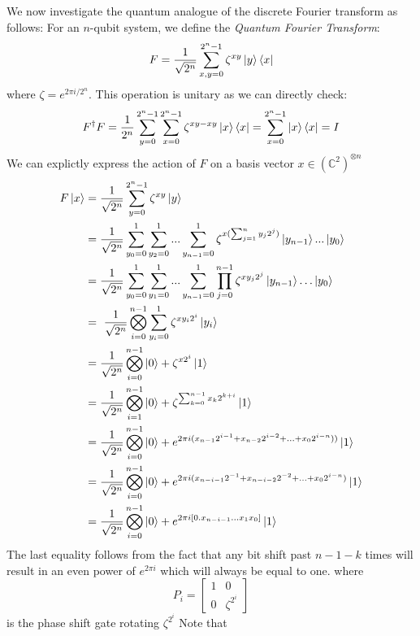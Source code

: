 We now investigate the quantum analogue of the discrete Fourier transform as follows:
%
For an $n$-qubit system, we define the \textit{Quantum Fourier Transform}:
%
$$ F = \frac{1}{\sqrt{2^n}} \sum_{x,y = 0}^{2^n-1} \zeta^{xy} \ket{y}\bra{x} $$
 where $\zeta = e^{2\pi i /2^n} $.
%
 This operation is unitary as we can directly check:
 $$ F^{\dagger}F = \frac{1}{2^n} \sum_{y = 0}^{2^n-1} \sum_{x = 0}^{2^n-1} \zeta^{xy - xy} \ket{x}\bra{x} = \sum_{x = 0}^{2^n -1} \ket{x}\bra{x} = I $$
%
 We can explictly express the action of $F$ on a basis vector $x \in (\mathbb{C}^2)^{\otimes n}$
\begin{gather*}
  \begin{split}
    F\ket{x} & = \frac{1}{\sqrt{2^n}} \sum_{y=0}^{2^n-1} \zeta^{xy} \ket{y} \\
     & = \frac{1}{\sqrt{2^n}} \sum_{y_0=0}^{1}\sum_{y_2=0}^{1}...\sum_{y_{n-1}=0}^{1} \zeta^{x(\sum_{j=1}^n y_j2^j)} \ket{y_{n-1}} ...\ket{y_0} \\
     & = \frac{1}{\sqrt{2^n}} \sum_{y_0=0}^{1}\sum_{y_1=0}^{1}...\sum_{y_{n-1}=0}^{1} \prod_{j=0}^{n-1} \zeta^{xy_j2^j} \ket{y_{n-1}} \ldots \ket{y_0}  \\
    & = \frac{1}{\sqrt{2^n}} \bigotimes_{i=0}^{n-1}\sum_{y_i=0}^1 \zeta^{xy_i2^i} \ket{y_i} \\
    & = \frac{1}{\sqrt{2^n}} \bigotimes_{i=0}^{n-1}\ket{0} + \zeta^{x2^i}\ket{1} \\
    & = \frac{1}{\sqrt{2^n}} \bigotimes_{i=1}^{n-1}\ket{0} + \zeta^{\sum_{k=0}^{n-1} x_k2^{k+i}}\ket{1} \\
    & = \frac{1}{\sqrt{2^n}} \bigotimes_{i=0}^{n-1}\ket{0} + e^{2\pi i(x_{n-1}2^{i-1} +x_{n-2}2^{i-2} + \ldots + x_{0} 2^{i-n}))}\ket{1} \\
    & = \frac{1}{\sqrt{2^n}} \bigotimes_{i=0}^{n-1}\ket{0} + e^{2\pi i(x_{n- i - 1}2^{-1} +x_{n- i - 2}2^{-2} + \ldots + x_{0} 2^{i-n})}\ket{1} \\
    & = \frac{1}{\sqrt{2^n}} \bigotimes_{i=0}^{n-1}\ket{0} + e^{2\pi i [ 0.x_{n-i-1}\ldots x_1x_0 ]} \ket{1}
  \end{split}
\end{gather*}
%
The last equality follows from the fact that any bit shift past $n-1-k$ times will result in an even power of $e^{2\pi i}$ which will always be equal to one.
where
$$P_i = \left[\begin{matrix} 1 & 0 \\ 0 & \zeta^{2^i} \end{matrix}\right]$$ is the phase shift gate rotating $\zeta^{2^i}$ Note that
